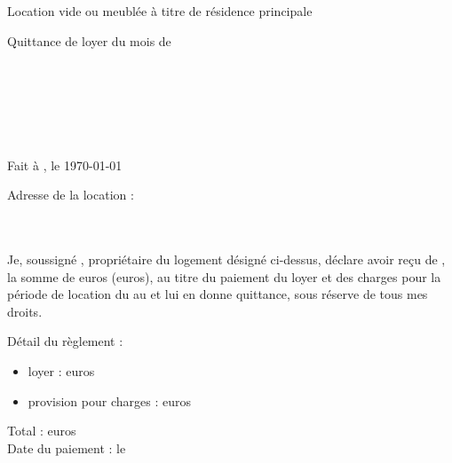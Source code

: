 \documentclass[12pt,a4paper]{article}
\begin{document}
\thispagestyle{empty}

\begin{center}
Location vide ou meublée à titre de résidence principale\\
\begin{LARGE}
Quittance de loyer du mois de \nommois\space\annee
\end{LARGE}
\end{center}
\bigskip

\begin{flushleft}
\nomproprio\\
\adresseproprio\\
\villeproprio
\end{flushleft}

\medskip

\begin{flushright}
\nomlocataire\\
\adresselocataire\\
\villelocataire
\end{flushright}

\medskip

\begin{flushright}
Fait à \lieudocument, le \today
\end{flushright}

\medskip

\begin{flushleft}
Adresse de la location :\\
\adresselocation\\
\lotlocation\\
\villelocation
\end{flushleft}

\medskip

\begin{flushleft}
\-\hspace{0.5cm}Je, soussigné \nomproprio, propriétaire du logement désigné ci-dessus, déclare avoir reçu
de \nomlocataire, la somme de \totalpaiementchiffres\space euros (\totalpaiementlettres\space euros), au titre
du paiement du loyer et des charges pour la période de location du \debutmois\space au
\finmois\space et lui en donne quittance, sous réserve de tous mes droits.
\end{flushleft}

\medskip

\begin{flushleft}
Détail du règlement :\\
\begin{itemize}
\item loyer : \loyerchiffres\space euros\\
\item provision pour charges : \charges\space euros\\
\end{itemize}
Total : \totalpaiementchiffres\space euros\\
Date du paiement : le \datepaiement
\end{flushleft}
\end{document}
